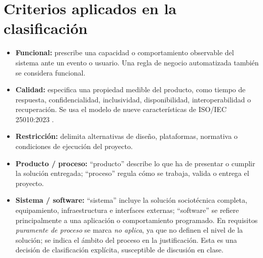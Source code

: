 \documentclass[11pt,a4paper]{article}
\begin{document}
\section{Criterios aplicados en la clasificación}
\begin{itemize}
  \item \textbf{Funcional:} prescribe una capacidad o comportamiento observable del sistema ante un evento o usuario. Una regla de negocio automatizada también se considera funcional.
  \item \textbf{Calidad:} especifica una propiedad medible del producto, como tiempo de respuesta, confidencialidad, inclusividad, disponibilidad, interoperabilidad o recuperación. Se usa el modelo de nueve características de ISO/IEC 25010:2023 \cite{iso25010}.
  \item \textbf{Restricción:} delimita alternativas de diseño, plataformas, normativa o condiciones de ejecución del proyecto.
  \item \textbf{Producto / proceso:} ``producto'' describe lo que ha de presentar o cumplir la solución entregada; ``proceso'' regula cómo se trabaja, valida o entrega el proyecto.
  \item \textbf{Sistema / software:} ``sistema'' incluye la solución sociotécnica completa, equipamiento, infraestructura e interfaces externas; ``software'' se refiere principalmente a una aplicación o comportamiento programado. En requisitos \emph{puramente de proceso} se marca \textit{no aplica}, ya que no definen el nivel de la solución; se indica el ámbito del proceso en la justificación. Esta es una decisión de clasificación explícita, susceptible de discusión en clase.
\end{itemize}
\end{document}
